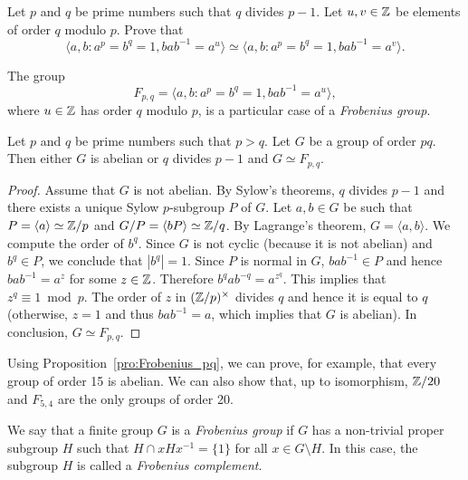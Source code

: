 \begin{exercise}
    Let $p$ and $q$ be prime numbers such that $q$ divides $p-1$. Let
    $u,v\in\mathbb{Z}$ be elements of order $q$ modulo $p$. 
    Prove that 
    \[
    \langle a,b:a^p=b^q=1,bab^{-1}=a^u\rangle
    \simeq \langle a,b:a^p=b^q=1,bab^{-1}=a^v\rangle.
    \]
\end{exercise}

The group   
\[
F_{p,q}=\langle a,b:a^p=b^q=1,bab^{-1}=a^u\rangle,
\]
where $u\in\mathbb{Z}$ has order $q$ modulo $p$, 
is a particular case of a  
\emph{Frobenius group}. 

\begin{proposition}
\label{pro:Frobenius_pq}
    Let $p$ and $q$ be prime numbers such that $p>q$. Let  
    $G$ be a group of order $pq$. Then either $G$ is abelian or
    $q$ divides $p-1$ and 
    $G\simeq F_{p,q}$.
\end{proposition}

\begin{proof}
    Assume that $G$ is not abelian. By Sylow's theorems, 
    $q$ divides $p-1$ and there exists 
    a unique Sylow $p$-subgroup $P$ of $G$. Let $a,b\in G$ be such that 
    $P=\langle a\rangle\simeq\mathbb{Z}/p$ and $G/P=\langle bP\rangle\simeq\mathbb{Z}/q$. By Lagrange's theorem, 
    $G=\langle a,b\rangle$. We compute the order of $b^q$. Since 
    $G$ is not cyclic (because it is not abelian) and $b^q\in P$, 
    we conclude that $|b^q|=1$. 
    Since $P$ is normal in $G$, 
    $bab^{-1}\in P$ and hence $bab^{-1}=a^z$ for some $z\in\mathbb{Z}$. Therefore
    $b^qab^{-q}=a^{z^q}$. This implies that 
    $z^q\equiv1\bmod p$. The order of $z$ in $(\mathbb{Z}/p)^{\times}$ divides 
    $q$ and hence it is equal to $q$ (otherwise, $z=1$ and thus $bab^{-1}=a$, which implies
    that $G$ is abelian). In conclusion, 
    $G\simeq F_{p,q}$. 
\end{proof}

Using Proposition~\ref{pro:Frobenius_pq}, we can prove, for example, that every group of order 15 is abelian. We can also show that, up to isomorphism, $\mathbb{Z}/20$ and $F_{5,4}$ are the only groups of order 20.

\begin{definition}
  We say that a finite group $G$ is a 
  \emph{Frobenius group} if $G$ 
  has a non-trivial proper subgroup $H$ such that $H\cap
  xHx^{-1}=\{1\}$ for all $x\in G\setminus H$. In this case, the subgroup 
  $H$ is called a \emph{Frobenius complement}.
\end{definition}

